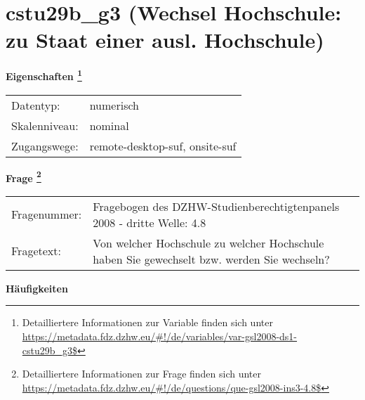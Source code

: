 
    \setcounter{footnote}{0}

    \vspace*{-1.8cm}
	\section{cstu29b\_g3 (Wechsel Hochschule: zu Staat einer ausl. Hochschule)}
	\label{section:cstu29b_g3}



    \vspace*{0.5cm}
    \noindent\textbf{Eigenschaften
	\footnote{Detailliertere Informationen zur Variable finden sich unter
		\url{https://metadata.fdz.dzhw.eu/\#!/de/variables/var-gsl2008-ds1-cstu29b_g3$}}}\\
	\begin{tabularx}{\hsize}{@{}lX}
	Datentyp: & numerisch \\
	Skalenniveau: & nominal \\
	Zugangswege: &
	  remote-desktop-suf, 
	  onsite-suf
 \\
    \end{tabularx}



				\vspace*{0.5cm}
                \noindent\textbf{Frage
	                \footnote{Detailliertere Informationen zur Frage finden sich unter
		              \url{https://metadata.fdz.dzhw.eu/\#!/de/questions/que-gsl2008-ins3-4.8$}}}\\
				\begin{tabularx}{\hsize}{@{}lX}
					Fragenummer: &
					  Fragebogen des DZHW-Studienberechtigtenpanels 2008 - dritte Welle:
					  4.8
 \\
					Fragetext: & Von welcher Hochschule zu welcher Hochschule haben Sie gewechselt bzw. werden Sie wechseln? \\
				\end{tabularx}





        		\vspace*{0.5cm}
                \noindent\textbf{Häufigkeiten}


